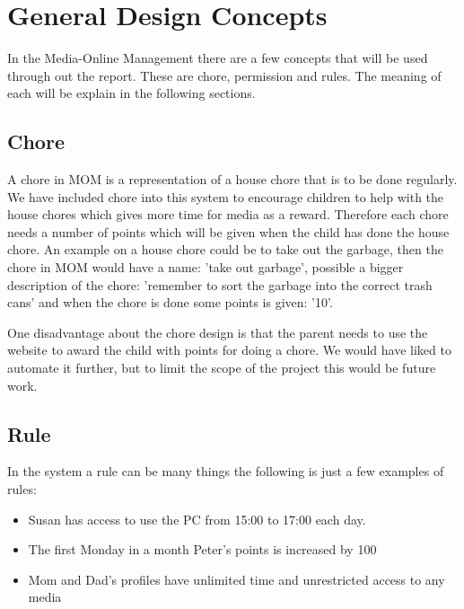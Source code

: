 \chapter{General Design Concepts}
\label{chapter:concepts}
In the Media-Online Management there are a few concepts that will be used through out the report. These are chore, permission and rules. The meaning of each will be explain in the following sections.

\section{Chore}
A chore in MOM is a representation of a house chore that is to be done regularly. We have included chore into this system to encourage children to help with the house chores which gives more time for media as a reward. Therefore each chore needs a number of points which will be given when the child has done the house chore. 
An example on a house chore could be to take out the garbage, then the chore in MOM would have a name: 'take out garbage', possible a bigger description of the chore: 'remember to sort the garbage into the correct trash cans' and when the chore is done some points is given: '10'.  

One disadvantage about the chore design is that the parent needs to use the website to award the child with points for doing a chore. We would have liked to automate it further, but to limit the scope of the project this would be future work.  
  



\section{Rule}
\label{sec:rule}
In the system a rule can be many things the following is just a few examples of rules:

\begin{itemize}
	\item Susan has access to use the PC from 15:00 to 17:00 each day.
	\item The first Monday in a month Peter's points is increased by 100
	\item Mom and Dad's profiles have unlimited time and unrestricted access to any media
\end{itemize}

